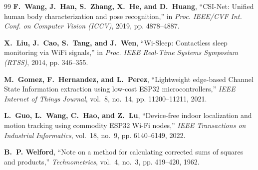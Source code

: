 \begin{thebibliography}{99}
{\bfseries F.~Wang, J.~Han, S.~Zhang, X.~He, and D.~Huang}, ``CSI-Net: Unified human body characterization and pose recognition,'' in {\em Proc. IEEE/CVF Int. Conf. on Computer Vision (ICCV)}, 2019, pp. 4878--4887.

{\bfseries X.~Liu, J.~Cao, S.~Tang, and J.~Wen}, ``Wi-Sleep: Contactless sleep monitoring via WiFi signals,'' in {\em Proc. IEEE Real-Time Systems Symposium (RTSS)}, 2014, pp. 346--355.

{\bfseries M.~Gomez, F.~Hernandez, and L.~Perez}, ``Lightweight edge-based Channel State Information extraction using low-cost ESP32 microcontrollers,'' {\em IEEE Internet of Things Journal}, vol.~8, no.~14, pp. 11200--11211, 2021.

{\bfseries L.~Guo, L.~Wang, C.~Hao, and Z.~Lu}, ``Device-free indoor localization and motion tracking using commodity ESP32 Wi-Fi nodes,'' {\em IEEE Transactions on Industrial Informatics}, vol.~18, no.~9, pp. 6140--6149, 2022.

{\bfseries B.~P. Welford}, ``Note on a method for calculating corrected sums of squares and products,'' {\em Technometrics}, vol.~4, no.~3, pp. 419--420, 1962.

\end{thebibliography}
